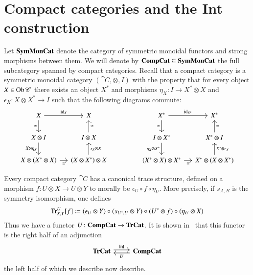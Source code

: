\documentclass[12pt,oneside,article,draft]{memoir}
\begin{document}
\section{Compact categories and the Int construction}\label{sec:compact and int}

Let $\mathbf{SymMonCat}$ denote the category of symmetric monoidal functors and strong morphisms between them.
We will denote by $\mathbf{CompCat}\subseteq\mathbf{SymMonCat}$ the full subcategory spanned by compact categories.
Recall that a compact category is a symmetric monoidal category $(\cat{C},\otimes,I)$ with the property that for every object $X\in\operatorname{Ob}\mathscr{C}$ there exists an object $X^*$ and morphisms $\eta_X\colon I\to X^*\otimes X$ and $\epsilon_X\colon X\otimes X^*\to I$ such that the following diagrams commute:
$$
	\begin{tikzcd}[column sep=small]
		X\arrow[r,"\id_X"]\arrow[d,"\cong"'] & X \\
		X\otimes I\arrow[d,"X\otimes\eta_X"'] & I\otimes X\arrow[u,"\cong"'] \\
		X\otimes(X^*\otimes X)\arrow[r,"\cong"'] & (X\otimes X^*)\otimes X\arrow[u,"\epsilon_X\otimes X"']
	\end{tikzcd}
	\hspace{.6in}
	\begin{tikzcd}[column sep=small]
		X^*\arrow[r,"\id_{X^*}"]\arrow[d,"\cong"'] & X^*\\
		I\otimes X^*\arrow[d,"\eta_X\otimes X^*"'] & X^*\otimes I\arrow[u,"\cong"'] \\
		(X^*\otimes X)\otimes X^*\arrow[r,"\cong"'] & X^*\otimes (X\otimes X^*)\arrow[u,"X^*\otimes\epsilon_X"']
	\end{tikzcd}
$$

Every compact category $\cat{C}$ has a canonical trace structure, defined on a morphism $f\colon U\otimes X\to U\otimes Y$ to morally be $\epsilon_U\circ f\circ \eta_U$.
More precisely, if $s_{A,B}$ is the symmetry isomorphism, one defines
	$$\operatorname{Tr}^U_{X,Y}[f]\coloneqq(\epsilon_U\otimes Y)\circ (s_{U^*,U}\otimes Y)\circ (U^*\otimes f)\circ (\eta_U\otimes X)$$
Thus we have a functor $U\colon\mathbf{CompCat}\to\mathbf{TrCat}$.
It is shown in~\cite{JoyalStreetVerity} that this functor is the right half of an adjunction
\begin{equation}\label{dia:traced compact adjunction}
\begin{tikzcd}
	\TrCat\arrow[r,shift left=.5ex, "\Int"]&\CompCat\arrow[l,shift left=.5ex,"U"]
\end{tikzcd}
\end{equation}
the left half of which we describe now describe. 
\end{document}
